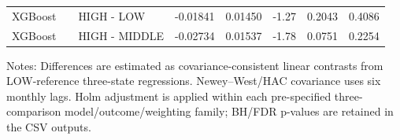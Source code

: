 \begin{table}[htbp]
\begin{tabular}{lllrrrrr}
XGBoost &  & HIGH - LOW & -0.01841 & 0.01450 & -1.27 & 0.2043 & 0.4086 \\
XGBoost &  & HIGH - MIDDLE & -0.02734 & 0.01537 & -1.78 & 0.0751 & 0.2254 \\
\hline
\end{tabular}
\begin{flushleft}\footnotesize Notes: Differences are estimated as covariance-consistent linear contrasts from LOW-reference three-state regressions. Newey--West/HAC covariance uses six monthly lags. Holm adjustment is applied within each pre-specified three-comparison model/outcome/weighting family; BH/FDR p-values are retained in the CSV outputs.\end{flushleft}
\end{table}
